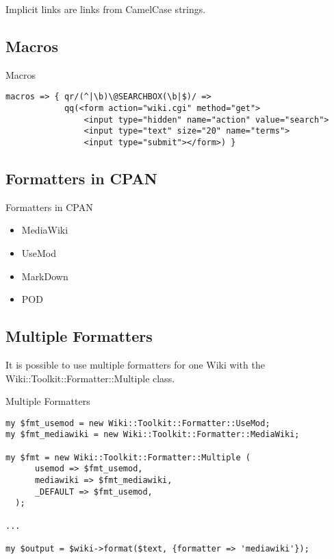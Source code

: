 Implicit links are links from CamelCase strings.

\subsection{Macros}

\begin{frame}[fragile]{Macros}
\begin{lstlisting}
macros => { qr/(^|\b)\@SEARCHBOX(\b|$)/ =>
            qq(<form action="wiki.cgi" method="get">
                <input type="hidden" name="action" value="search">
                <input type="text" size="20" name="terms">
                <input type="submit"></form>) }
\end{lstlisting}
\end{frame}



\subsection{Formatters in CPAN}

\begin{frame}{Formatters in CPAN}
 \begin{itemize}
  \item MediaWiki
  \item UseMod
  \item MarkDown
  \item POD
 \end{itemize}
\end{frame}

\subsection{Multiple Formatters}

It is possible to use multiple formatters for one Wiki with
the Wiki::Toolkit::Formatter::Multiple class.

\begin{frame}[fragile]{Multiple Formatters}
\begin{lstlisting}
my $fmt_usemod = new Wiki::Toolkit::Formatter::UseMod;
my $fmt_mediawiki = new Wiki::Toolkit::Formatter::MediaWiki;

my $fmt = new Wiki::Toolkit::Formatter::Multiple (
      usemod => $fmt_usemod,
      mediawiki => $fmt_mediawiki,
      _DEFAULT => $fmt_usemod,
  );

...

my $output = $wiki->format($text, {formatter => 'mediawiki'});
\end{lstlisting}
\end{frame}


